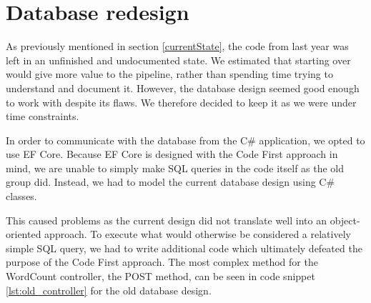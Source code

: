 \section{Database redesign} \label{DatabaseRedesign}

As previously mentioned in section \ref{currentState}, the code from last year was left in an unfinished and undocumented state. We estimated that starting over would give more value to the pipeline, rather than spending time trying to understand and document it.
However, the database design seemed good enough to work with despite its flaws. 
We therefore decided to keep it as we were under time constraints.

In order to communicate with the database from the C\# application, we opted to use EF Core.
Because EF Core is designed with the Code First approach in mind, we are unable to simply make SQL queries in the code itself as the old group did. 
Instead, we had to model the current database design using C\# classes. 

This caused problems as the current design did not translate well into an object-oriented approach.
To execute what would otherwise be considered a relatively simple SQL query, we had to write additional code which ultimately defeated the purpose of the Code First approach. 
The most complex method for the WordCount controller, the POST method, can be seen in code snippet \ref{lst:old_controller} for the old database design.

